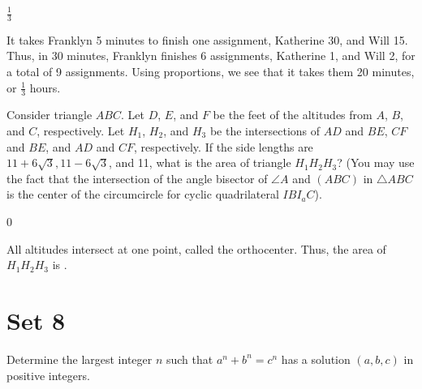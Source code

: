 \documentclass[11pt]{article}
\begin{document}
\begin{answer}
$\frac{1}{3}$
\end{answer}

\begin{solution}
It takes Franklyn 5 minutes to finish one assignment, Katherine 30, and Will 15. Thus, in 30 minutes, Franklyn finishes 6 assignments, Katherine 1, and Will 2, for a total of 9 assignments. Using proportions, we see that it takes them 20 minutes, or $\boxed{\frac{1}{3}}$ hours.
\end{solution}

\begin{problem} %
Consider triangle $ABC$. Let $D$, $E$, and $F$ be the feet of the altitudes from $A$, $B$, and $C$, respectively. Let $H_1$, $H_2$, and $H_3$ be the intersections of $AD$ and $BE$, $CF$ and $BE$, and $AD$ and $CF$, respectively. If the side lengths are $11+6\sqrt{3}, 11-6\sqrt{3}$, and 11, what is the area of triangle $H_1H_2H_3$? (You may use the fact that the intersection of the angle bisector of $\angle{A}$ and $(ABC)$ in $\triangle{ABC}$ is the center of the circumcircle for cyclic quadrilateral $IBI_aC$).
\end{problem}

\begin{answer}
0
\end{answer}

\begin{solution}
All altitudes intersect at one point, called the orthocenter. Thus, the area of $H_1H_2H_3$ is .
\end{solution}
\newpage
\section*{Set 8}

\begin{problem}
Determine the largest integer $n$ such that $a^n + b^n = c^n$ has a solution $(a, b, c)$ in positive integers.
\end{problem}
\end{document}
